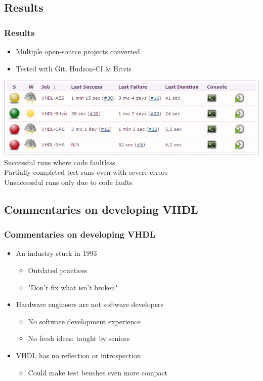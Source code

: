 \documentclass[british,10pt]{beamer}
\begin{document}
\subsection{Results}
\begin{frame}\frametitle{Results}
\begin{itemize}
\item Multiple open-source projects converted
\item Tested with Git, Hudson-CI \& Bitvis
\end{itemize}
\medskip
{\centering
\includegraphics[width=\textwidth]{images/jobs.png}}
\\\hskip10pt Successful runs where code faultless
\\\hskip10pt Partially completed test-runs even with severe errors
\\\hskip10pt Unsuccessful runs only due to code faults\\
\end{frame}


\subsection{Commentaries on developing VHDL}
\begin{frame}\frametitle{Commentaries on developing VHDL}
\begin{itemize}
\item An industry stuck in 1993
\begin{itemize}
\item Outdated practices
\item "Don't fix what isn't broken"
\end{itemize}
\item Hardware engineers are not software developers
\begin{itemize}
\item No software development experience
\item No fresh ideas: taught by seniors
\end{itemize}
\item VHDL has no reflection or introspection
\begin{itemize}
\item Could make test benches even more compact
\end{itemize}
\end{itemize}
\end{frame}
\end{document}
